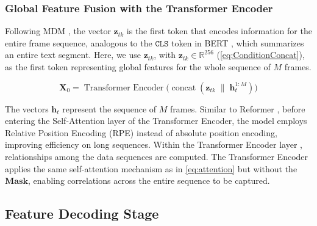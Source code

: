 \subsubsection{Global Feature Fusion with the Transformer Encoder}
%

Following MDM \citep{tevet2022human}, the vector $\mathbf{z}_{tk}$ is the first token that encodes information for the entire frame sequence, analogous to the $\texttt{CLS}$ token in BERT \citep{devlin2019bertpretrainingdeepbidirectional}, which summarizes an entire text segment.
Here, we use $\mathbf{z}_{tk}$, with $\mathbf{z}_{tk} \in \mathbb{R}^{256}$ (\autoref{eq:ConditionConcat}), as the first token representing global features for the whole sequence of $M$ frames.

\begin{equation}
	\mathbf{X}_{0} = \operatorname{Transformer\ Encoder}\bigl(\operatorname{concat}(\mathbf{z}_{tk} \;\|\; \mathbf{h}^{1:M}_{t})\bigr)
	\label{eq:TransformerEncoder}
\end{equation}

The vectors $\mathbf{h}_t$ represent the sequence of $M$ frames. Similar to Reformer \citep{kitaev2020reformer}, before entering the Self-Attention layer of the Transformer Encoder, the model employs Relative Position Encoding (RPE) instead of absolute position encoding, improving efficiency on long sequences.
Within the Transformer Encoder layer \citep{vaswani2017attention}, relationships among the data sequences are computed.
The Transformer Encoder applies the same self-attention mechanism as in \autoref{eq:attention} but without the $\mathbf{Mask}$, enabling correlations across the entire sequence to be captured.





\subsection{Feature Decoding Stage}

